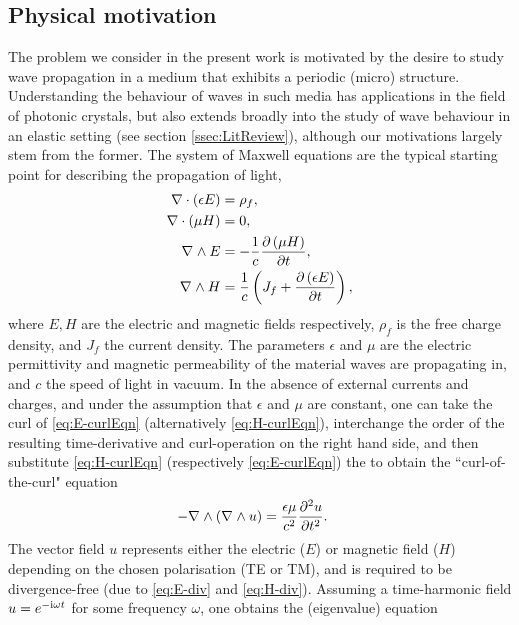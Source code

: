 \subsection{Physical motivation} \label{ssec:PhysMot}
The problem we consider in the present work is motivated by the desire to study wave propagation in a medium that exhibits a periodic (micro) structure.
Understanding the behaviour of waves in such media has applications in the field of photonic crystals, but also extends broadly into the study of wave behaviour in an elastic setting (see section \ref{ssec:LitReview}), although our motivations largely stem from the former.
The system of Maxwell equations are the typical starting point for describing the propagation of light,
\begin{subequations} \label{eq:MaxwellSystem}
	\begin{align} 
		\nabla \cdot \left( \epsilon E \right) &= \rho_{f}, \label{eq:E-div} \\
		\nabla \cdot \left( \mu H \right) &= 0, \label{eq:H-div} \\
		\nabla_{}\wedge E &= -\frac{1}{c} \dfrac{\partial \left( \mu H \right)}{\partial t}, \label{eq:E-curlEqn}\\
		\nabla_{}\wedge H &= \frac{1}{c}\left( J_{f} + \dfrac{\partial \left( \epsilon E \right)}{\partial t} \right), \label{eq:H-curlEqn}
	\end{align}
\end{subequations}
where $E, H$ are the electric and magnetic fields respectively, $\rho_{f}$ is the free charge density, and $J_f$ the current density. 
The parameters $\epsilon$ and $\mu$ are the electric permittivity and magnetic permeability of the material waves are propagating in, and $c$ the speed of light in vacuum.
In the absence of external currents and charges, and under the assumption that $\epsilon$ and $\mu$ are constant, one can take the curl of \eqref{eq:E-curlEqn} (alternatively \eqref{eq:H-curlEqn}), interchange the order of the resulting time-derivative and curl-operation on the right hand side, and then substitute \eqref{eq:H-curlEqn} (respectively \eqref{eq:E-curlEqn}) the to obtain the ``curl-of-the-curl" equation
\begin{align*}
	- \nabla_{}\wedge\left(  \nabla_{}\wedge u  \right) &= \frac{\epsilon\mu}{c^2}\dfrac{\partial^2 u}{\partial {t}^2}.
\end{align*}
The vector field $u$ represents either the electric ($E$) or magnetic field ($H$) depending on the chosen polarisation (TE or TM), and is required to be divergence-free (due to \eqref{eq:E-div} and \eqref{eq:H-div}).
Assuming a time-harmonic field $u = e^{-\mathrm{i}\omega t}$ for some frequency $\omega$, one obtains the (eigenvalue) equation

